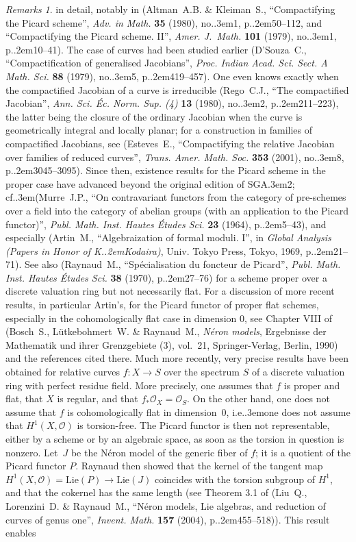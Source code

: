 \documentclass[11pt,a4paper,oneside]{book}
\providecommand{\sisi}[2]{#2}
\providecommand{\og}{``}
\providecommand{\fg}{''\xspace}
\providecommand{\cf}{cf.\kern.3em}
\providecommand{\ie}{i.e.\kern.3em}
\providecommand{\SGA}{\textup{SGA}\kern.3em}
\providecommand{\ptbl}{.\kern.2em}
\providecommand{\numero}{no.\kern.3em}
\providecommand{\Oo}{\mathcal O}
\providecommand{\OX}{\mathcal O_X}
\theoremstyle{plain}
\theoremstyle{definition}
\theoremstyle{remark}
\newtheorem{remarques}[subsection]{Remarks}
\begin{document}
\begin{remarques}
in detail, notably in (Altman~A.B. \& Kleiman~S., {\og Compactifying the Picard scheme\fg}, \emph{Adv. in Math.} \textbf{35} (1980), \numero 1, p\ptbl 50--112, and {\og Compactifying the Picard scheme. II\fg}, \emph{Amer. J.~Math.} \textbf{101} (1979), \numero 1, p\ptbl 10--41). The case of curves had been studied earlier (D'Souza~C., {\og Compactification of generalised Jacobians\fg}, \emph{Proc. Indian Acad. Sci. Sect. A Math. Sci.} \textbf{88} (1979), \numero 5, p\ptbl 419--457). One even knows exactly when the compactified Jacobian of a curve is irreducible (Rego~C.J., {\og The compactified Jacobian\fg}, \emph{Ann. Sci. \'Ec. Norm. Sup. (4)} \textbf{13} (1980), \numero 2, p\ptbl 211--223), the latter being the closure of the ordinary Jacobian when the curve is geometrically integral and locally planar; for a construction in families of compactified Jacobians, see (Esteves~E., {\og Compactifying the relative Jacobian over families of reduced curves\fg}, \emph{Trans. Amer. Math. Soc.} \textbf{353} (2001), \numero 8, p\ptbl 3045--3095). Since then, existence results for the Picard scheme in the proper case have advanced beyond the original edition of \SGA 2; \cf (Murre~J.P., {\og On contravariant functors from the category of pre-schemes over a field into the category of abelian groups (with an application to the Picard functor)\fg}, \emph{Publ. Math. Inst. Hautes \'Etudes Sci.} \textbf{23} (1964), p\ptbl 5--43), and especially (Artin~M., {\og Algebraization of formal moduli. I\fg}, in \emph{Global Analysis (Papers in Honor of K\ptbl Kodaira)}, Univ. Tokyo Press, Tokyo, 1969, p\ptbl 21--71). See also (Raynaud~M., {\og Sp\'ecialisation du foncteur de Picard\fg}, \emph{Publ. Math. Inst. Hautes \'Etudes Sci.} \textbf{38} (1970), p\ptbl 27--76) for a scheme proper over a discrete valuation ring but not necessarily flat. For a discussion of more recent results, in particular Artin's, for the Picard functor of proper flat schemes, especially in the cohomologically flat case in dimension $0$, see Chapter VIII of (Bosch~S., L\"utkebohmert~W. \& Raynaud~M., \emph{N\'eron models}, Ergebnisse der Mathematik und ihrer Grenzgebiete (3), vol.~21, Springer-Verlag, Berlin, 1990) and the references cited there. Much more recently, very precise results have been obtained for relative curves $f:X\to S$ \sisi{over}{over} the spectrum $S$ of a discrete valuation ring with perfect residue field. More precisely, one assumes that $f$ is proper and flat, that $X$ is regular, and that $f_*\OX=\Oo_S$. On the other hand, one does not assume that $f$ is cohomologically flat in dimension~$0$, \ie one does not assume that $H^1(X,\Oo)$ is torsion-free. The Picard functor is then not representable, either by a scheme or by an algebraic space, as soon as the torsion in question is nonzero. Let~$J$ be the N\'eron model of the generic fiber of $f$; it is a quotient of the Picard functor $P$. Raynaud then showed that the kernel of the tangent map $H^1(X,\Oo)=\mathrm{Lie}(P)\to\mathrm{Lie}(J)$ coincides with the torsion subgroup of $H^1$, and that the cokernel has the same length (see Theorem 3.1 of (Liu~Q., Lorenzini~D. \& Raynaud~M., {\og N\'eron models, Lie algebras, and reduction of curves of genus one\fg}, \emph{Invent. Math.} \textbf{157} (2004), p\ptbl 455--518)). This result enables 
\end{remarques}
\end{document}
